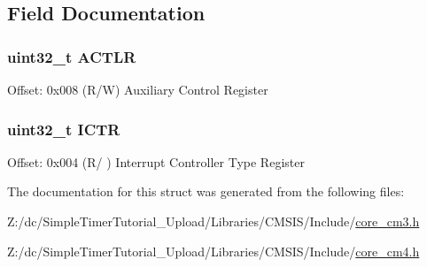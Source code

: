 \subsection{Field Documentation}
\hypertarget{struct_s_cn_s_c_b___type_a9a73f00a0223775caeb09c5c6abb3087}{
\subsubsection[{A\-C\-T\-L\-R}]{ uint32\-\_\-t A\-C\-T\-L\-R}}\label{struct_s_cn_s_c_b___type_a9a73f00a0223775caeb09c5c6abb3087}
Offset\-: 0x008 (R/\-W) Auxiliary Control Register \hypertarget{struct_s_cn_s_c_b___type_a5bb2c6795b90f12077534825cc844b56}{
\subsubsection[{I\-C\-T\-R}]{ uint32\-\_\-t I\-C\-T\-R}}\label{struct_s_cn_s_c_b___type_a5bb2c6795b90f12077534825cc844b56}
Offset\-: 0x004 (R/ ) Interrupt Controller Type Register 

The documentation for this struct was generated from the following files\-:\begin{DoxyCompactItemize}
\item 
Z\-:/dc/\-Simple\-Timer\-Tutorial\-\_\-\-Upload/\-Libraries/\-C\-M\-S\-I\-S/\-Include/\hyperlink{core__cm3_8h}{core\-\_\-cm3.\-h}\item 
Z\-:/dc/\-Simple\-Timer\-Tutorial\-\_\-\-Upload/\-Libraries/\-C\-M\-S\-I\-S/\-Include/\hyperlink{core__cm4_8h}{core\-\_\-cm4.\-h}\end{DoxyCompactItemize}
